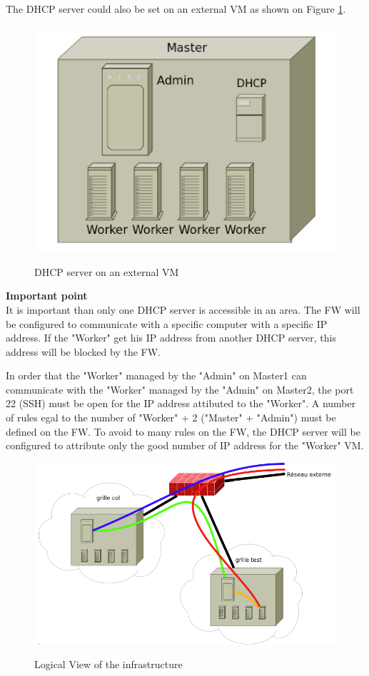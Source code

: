 The DHCP server could also be set on an external VM as shown on Figure \ref{fig:dmz_dhcp2}.

\begin{figure}[ht]
	\caption{DHCP server on an external VM}
  	\centering
	\includegraphics[scale=0.6]{./pic/dmz3.png}
	\label{fig:dmz_dhcp2}
\end{figure}

\textbf{Important point}\\
It is important than only one DHCP server is accessible in an area. The FW will be configured to communicate with a specific computer with a specific IP address. If the "Worker" get his IP address from another DHCP server, this address will be blocked by the FW.\s

In order that the "Worker" managed by the "Admin" on Master1 can communicate with the "Worker" managed by the "Admin" on Master2, the port 22 (SSH) must be open for the IP address attibuted to the "Worker". A number of rules egal to the number of "Worker" + 2 ("Master" + "Admin") must be defined on the FW. To avoid to many rules on the FW, the DHCP server will be configured to attribute only the good number of IP address for the "Worker" VM. \s

\begin{figure}[ht]
	\caption{Logical View of the infrastructure}
  	\centering
	\includegraphics[scale=0.6]{./pic/dmz4.png}
	\label{fig:logical_dmz}
\end{figure}

